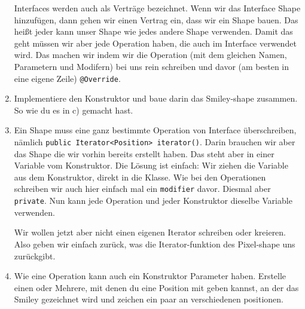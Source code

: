 \begin{enumerate}
\begin{Infobox}[Interface]
        Interfaces werden auch als Verträge bezeichnet.
        Wenn wir das Interface Shape hinzufügen, dann gehen wir einen Vertrag ein, dass wir ein Shape bauen.
        Das heißt jeder kann unser Shape wie jedes andere Shape verwenden.
        Damit das geht müssen wir aber jede Operation haben, die auch im Interface verwendet wird.
        Das machen wir indem wir die Operation (mit dem gleichen Namen, Parametern und Modifern) bei uns rein schreiben und davor (am besten in eine eigene Zeile) \lstinline{@Override}.
    \end{Infobox}    
    \item Implementiere den Konstruktor und baue darin das Smiley-shape zusammen. So wie du es in c) gemacht hast.
    \item Ein Shape muss eine ganz bestimmte Operation von Interface überschreiben, nämlich \lstinline{public Iterator<Position> iterator()}.
    Darin brauchen wir aber das Shape die wir vorhin bereits erstellt haben.
    Das steht aber in einer Variable vom Konstruktor.
    Die Lösung ist einfach: Wir ziehen die Variable aus dem Konstruktor, direkt in die Klasse.
    Wie bei den Operationen schreiben wir auch hier einfach mal ein  \lstinline{modifier} davor. Diesmal aber \lstinline{private}.
    Nun kann jede Operation und  jeder Konstruktor dieselbe Variable verwenden.

    Wir wollen jetzt aber nicht einen eigenen Iterator schreiben oder kreieren. Also geben wir einfach zurück, was die Iterator-funktion des Pixel-shape uns zurückgibt.
    \item Wie eine Operation kann auch ein Konstruktor Parameter haben.
    Erstelle einen oder Mehrere, mit denen du eine Position mit geben kannst, an der das Smiley gezeichnet wird
    und zeichen ein paar an verschiedenen positionen.
\end{enumerate}

\newpage
